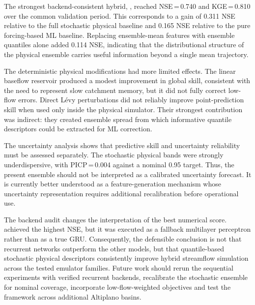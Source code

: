 \documentclass[a4paper,fleqn]{cas-sc}
\newcommand{\modelid}[1]{\begingroup\urlstyle{same}\path{#1}\endgroup}
\begin{document}
The strongest backend-consistent hybrid, \modelid{E6_HYB_XGB_QUANTILES},
reached NSE\,=\,0.740 and KGE\,=\,0.810 over the common validation
period. This corresponds to a gain of 0.311 NSE relative to the full
stochastic physical baseline and 0.165 NSE relative to the pure
forcing-based ML baseline. Replacing ensemble-mean features with
ensemble quantiles alone added 0.114 NSE, indicating that the
distributional structure of the physical ensemble carries useful
information beyond a single mean trajectory.

The deterministic physical modifications had more limited effects. The
linear baseflow reservoir produced a modest improvement in global skill,
consistent with the need to represent slow catchment memory, but it did
not fully correct low-flow errors. Direct L\'{e}vy perturbations did not
reliably improve point-prediction skill when used only inside the
physical simulator. Their strongest contribution was indirect: they
created ensemble spread from which informative quantile descriptors
could be extracted for ML correction.

The uncertainty analysis shows that predictive skill and uncertainty
reliability must be assessed separately. The stochastic physical bands
were strongly underdispersive, with PICP\,=\,0.004 against a nominal
0.95 target. Thus, the present ensemble should not be interpreted as a
calibrated uncertainty forecast. It is currently better understood as a
feature-generation mechanism whose uncertainty representation requires
additional recalibration before operational use.

The backend audit changes the interpretation of the best numerical
score. \modelid{E8_HYB_GRU_QUANTILES} achieved the highest NSE, but it was
executed as a fallback multilayer perceptron rather than as a true GRU.
Consequently, the defensible conclusion is not that recurrent networks
outperform the other models, but that quantile-based stochastic
physical descriptors consistently improve hybrid streamflow simulation
across the tested emulator families. Future work should rerun the
sequential experiments with verified recurrent backends, recalibrate the
stochastic ensemble for nominal coverage, incorporate low-flow-weighted
objectives and test the framework across additional Altiplano basins.

\end{document}
